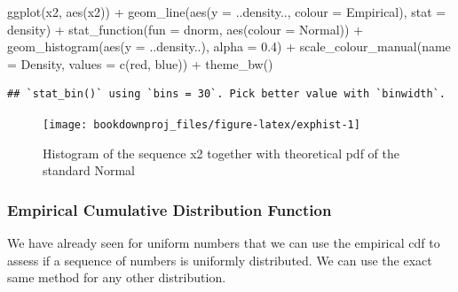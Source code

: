 \documentclass[
]{book}
\newenvironment{Shaded}{\begin{snugshade}}{\end{snugshade}}
\newcommand{\AttributeTok}[1]{\textcolor[rgb]{0.77,0.63,0.00}{#1}}
\newcommand{\FloatTok}[1]{\textcolor[rgb]{0.00,0.00,0.81}{#1}}
\newcommand{\FunctionTok}[1]{\textcolor[rgb]{0.00,0.00,0.00}{#1}}
\newcommand{\NormalTok}[1]{#1}
\newcommand{\SpecialCharTok}[1]{\textcolor[rgb]{0.00,0.00,0.00}{#1}}
\newcommand{\StringTok}[1]{\textcolor[rgb]{0.31,0.60,0.02}{#1}}
\begin{document}
\begin{Shaded}
\begin{Highlighting}[]
\FunctionTok{ggplot}\NormalTok{(x2, }\FunctionTok{aes}\NormalTok{(x2)) }\SpecialCharTok{+}
   \FunctionTok{geom\_line}\NormalTok{(}\FunctionTok{aes}\NormalTok{(}\AttributeTok{y =}\NormalTok{ ..density.., }\AttributeTok{colour =} \StringTok{\textquotesingle{}Empirical\textquotesingle{}}\NormalTok{), }\AttributeTok{stat =} \StringTok{\textquotesingle{}density\textquotesingle{}}\NormalTok{) }\SpecialCharTok{+}
   \FunctionTok{stat\_function}\NormalTok{(}\AttributeTok{fun =}\NormalTok{ dnorm, }\FunctionTok{aes}\NormalTok{(}\AttributeTok{colour =} \StringTok{\textquotesingle{}Normal\textquotesingle{}}\NormalTok{)) }\SpecialCharTok{+}      
   \FunctionTok{geom\_histogram}\NormalTok{(}\FunctionTok{aes}\NormalTok{(}\AttributeTok{y =}\NormalTok{ ..density..), }\AttributeTok{alpha =} \FloatTok{0.4}\NormalTok{) }\SpecialCharTok{+}      
   \FunctionTok{scale\_colour\_manual}\NormalTok{(}\AttributeTok{name =} \StringTok{\textquotesingle{}Density\textquotesingle{}}\NormalTok{, }\AttributeTok{values =} \FunctionTok{c}\NormalTok{(}\StringTok{\textquotesingle{}red\textquotesingle{}}\NormalTok{, }\StringTok{\textquotesingle{}blue\textquotesingle{}}\NormalTok{)) }\SpecialCharTok{+}
   \FunctionTok{theme\_bw}\NormalTok{()}
\end{Highlighting}
\end{Shaded}

\begin{verbatim}
## `stat_bin()` using `bins = 30`. Pick better value with `binwidth`.
\end{verbatim}

\begin{figure}

{\centering \texttt{[image: bookdownproj\_files/figure-latex/exphist-1]} 

}

\caption{Histogram of the sequence x2 together with theoretical pdf of the standard Normal}\label{fig:exphist}
\end{figure}

\hypertarget{empirical-cumulative-distribution-function}{%
\subsubsection{Empirical Cumulative Distribution Function}\label{empirical-cumulative-distribution-function}}

We have already seen for uniform numbers that we can use the empirical cdf to assess if a sequence of numbers is uniformly distributed. We can use the exact same method for any other distribution.
\end{document}
